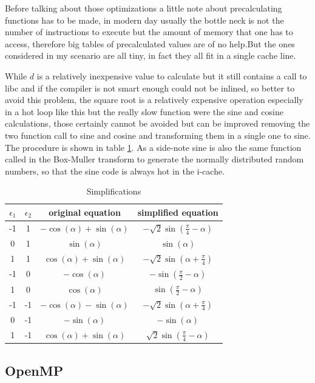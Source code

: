 \documentclass[Lau]{sapthesis} %
\let\oldsection\section
\let\oldsubsection\subsection
\def\subsubsection{\oldsubsection}
\def\subsection{\oldsection}
\def\section{\chapter}
\begin{document}
Before talking about those optimizations a little note about precalculating
functions has to be made, in modern day usually the bottle neck is not the
number of instructions to execute but the amount of memory that one has to
access, therefore big tables of precalculated values are of no help.But the
ones considered in my scenario are all tiny, in fact they all fit in a single
cache line.

While $d$ is a relatively inexpensive value to calculate but it still contains a
call to libc and if the compiler is not smart enough could not be inlined, so
better to avoid this problem, the square root is a relatively expensive
operation especially in a hot loop like this but the really slow function were
the sine and cosine calculations, those certainly cannot be avoided but can be
improved removing the two function call to sine and cosine and transforming them
in a single one to sine. The procedure is shown in table
\ref{tab:simplifications}. As a side-note sine is also the same function called
in the Box-Muller transform to generate the normally distributed random numbers,
so that the sine code is always hot in the i-cache.

\begin{table}
\centering
\begin{tabular}{c c | c | c}
$\epsilon_1$ & $\epsilon_2$ & original equation & simplified equation\\
\hline
-1 & 1 & $-\cos(\alpha)+\sin(\alpha)$ & $-\sqrt{2}\sin(\frac{\pi}{4}-\alpha)$\\
0 & 1 & $\sin(\alpha)$ & $\sin(\alpha)$\\
1 & 1 & $\cos(\alpha) + \sin(\alpha)$ & $-\sqrt{2}\sin(\alpha+\frac{\pi}{4})$\\
-1 & 0 & $-\cos(\alpha)$ & $-\sin(\frac{\pi}{2}-\alpha)$\\
1 & 0 & $\cos(\alpha)$ & $\sin(\frac{\pi}{2}-\alpha)$\\
-1 & -1 & $-\cos(\alpha)-\sin(\alpha)$ & $-\sqrt{2}\sin(\alpha+\frac{\pi}{4})$\\
0 & -1 & $-\sin(\alpha)$ & $-\sin(\alpha)$\\
1 & -1 & $\cos(\alpha) + \sin(\alpha)$ & $\sqrt{2}\sin(\frac{\pi}{4}-\alpha)$\\
\end{tabular}
\caption{Simplifications}
\label{tab:simplifications}
\end{table}

\subsubsection{OpenMP}
\end{document}
